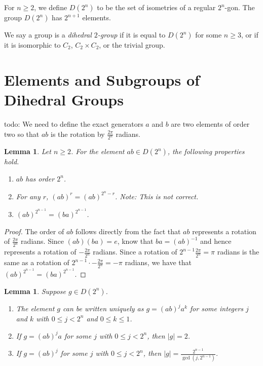 \documentclass{amsart}
\numberwithin{equation} {section}
\newtheorem{lemma}[equation]{Lemma}
\theoremstyle{definition}
\begin{document}
For $n \geq 2$, we define $D(2^n)$ to be the set of isometries of a regular $2^n$-gon. The group $D(2^n)$ has $2^{n+1}$ elements. 

We say a group is a  \textit{dihedral $2$-group} if it is equal to $D(2^n)$ for some $n \geq 3$, or if it is isomorphic to $C_2$, $C_2 \times C_2$, or the trivial group. 


\section{Elements and Subgroups of Dihedral Groups}

todo: We need to define the exact generators $a$ and $b$ are two elements of order two so that $ab$ is the rotation by $\displaystyle\frac{2\pi}{2^n}$ radians. 

\begin{lemma}\label{l:ab-order-lemma}
Let $n \geq 2$. For the element $ab \in D(2^n)$, the following properties hold. 
\begin{enumerate}
\item[(i.)] $ab$ has order $2^{n}$.
\item[(ii.)] For any $r$, $(ab)^{r} = (ab)^{2^n - r}$. Note: This is not correct. 
\item[(iii.)] $(ab)^{2^{n-1}} = (ba)^{2^{n-1}}$. 
\end{enumerate}
\end{lemma}

\begin{proof}
The order of $ab$ follows directly from the fact that $ab$ represents a rotation of $\displaystyle\frac{2\pi}{2^n}$ radians. Since $(ab)(ba) = e$, know that $ba = (ab)^{-1}$ and hence represents a rotation of  $-\displaystyle\frac{2\pi}{2^n}$ radians. Since a rotation of $2^{n-1} \displaystyle\frac{2\pi}{2^n} = \pi$ radians is the same as a rotation of $ 2^{n-1} \cdot -\displaystyle\frac{2\pi}{2^n} = -\pi$ radians, we have that $(ab)^{2^{n-1}} = (ba)^{2^{n-1}}$. 
\end{proof}

\begin{lemma}\label{l:normal-form}
Suppose $g \in D(2^n)$. 
\begin{enumerate}
\item[(i.)] The element $g$ can be written uniquely as $g = (ab)^ja^k$ for some integers $j$ and $k$ with $0 \leq j < 2^{n}$ and $0 \leq k \leq 1$. 
\item[(ii.)] If $g = (ab)^ja$ for some $j$ with $0 \leq j < 2^{n}$, then $|g| = 2$. 
\item[(iii.)] If $g = (ab)^j$ for some $j$ with $0 \leq j < 2^{n}$, then $|g| = \displaystyle\frac{2^{n-1}}{\gcd(j,2^{n-1})}$. 
\end{enumerate}
\end{lemma}
\end{document}
